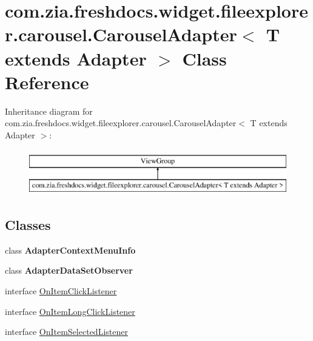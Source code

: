 \hypertarget{classcom_1_1zia_1_1freshdocs_1_1widget_1_1fileexplorer_1_1carousel_1_1_carousel_adapter_3_01_t_01extends_01_adapter_01_4}{\section{com.\-zia.\-freshdocs.\-widget.\-fileexplorer.\-carousel.\-Carousel\-Adapter$<$ T extends Adapter $>$ Class Reference}
\label{classcom_1_1zia_1_1freshdocs_1_1widget_1_1fileexplorer_1_1carousel_1_1_carousel_adapter_3_01_t_01extends_01_adapter_01_4}
}
Inheritance diagram for com.\-zia.\-freshdocs.\-widget.\-fileexplorer.\-carousel.\-Carousel\-Adapter$<$ T extends Adapter $>$\-:\begin{figure}[H]
\begin{center}
\leavevmode
\includegraphics[height=2.000000cm]{classcom_1_1zia_1_1freshdocs_1_1widget_1_1fileexplorer_1_1carousel_1_1_carousel_adapter_3_01_t_01extends_01_adapter_01_4}
\end{center}
\end{figure}
\subsection*{Classes}
\begin{DoxyCompactItemize}
\item 
class {\bfseries Adapter\-Context\-Menu\-Info}
\item 
class {\bfseries Adapter\-Data\-Set\-Observer}
\item 
interface \hyperlink{interfacecom_1_1zia_1_1freshdocs_1_1widget_1_1fileexplorer_1_1carousel_1_1_carousel_adapter_3_016aa018e3c29295f5f939e141af9765f4}{On\-Item\-Click\-Listener}
\item 
interface \hyperlink{interfacecom_1_1zia_1_1freshdocs_1_1widget_1_1fileexplorer_1_1carousel_1_1_carousel_adapter_3_018fa25a89e81a066e4e36ba61d1427192}{On\-Item\-Long\-Click\-Listener}
\item 
interface \hyperlink{interfacecom_1_1zia_1_1freshdocs_1_1widget_1_1fileexplorer_1_1carousel_1_1_carousel_adapter_3_0138b057ca54626d11bff1bb2116384ee5}{On\-Item\-Selected\-Listener}
\end{DoxyCompactItemize}

